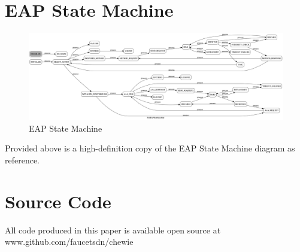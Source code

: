 \appendix
\section{EAP State Machine}
\begin{figure}\begin{center}
    \includegraphics[angle=-90, scale=0.18]{images/eap_state_machine.png}
    \caption{EAP State Machine}
    \label{fig:large_eap_state_machine}
\end{center}\end{figure}
Provided above is a high-definition copy of the EAP State Machine diagram as reference.
\section{Source Code}
All code produced in this paper is available open source at \\ www.github.com/faucetsdn/chewie


